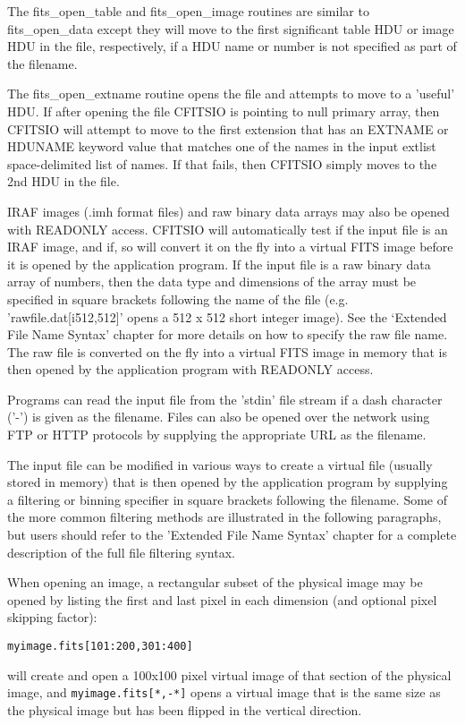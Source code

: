 \documentclass[11pt]{book}
\begin{document}
\begin{description}
The fits\_open\_table and fits\_open\_image routines are similar to
fits\_open\_data except they will move to the first significant table
HDU or image HDU in the file, respectively, if a HDU name or
number is not specified as part of the filename.

The fits\_open\_extname routine opens the file and attempts to move to a 'useful'
HDU. If after opening the file CFITSIO is pointing to null primary array,
then CFITSIO will attempt to move to the first extension that has an EXTNAME or
HDUNAME keyword value that matches one of the names in the input extlist
space-delimited list of names.  If that fails, then CFITSIO simply moves to the
2nd HDU in the file.

IRAF images (.imh format files) and raw binary data arrays may also be
opened with READONLY access.  CFITSIO will automatically test if the
input file is an IRAF image, and if, so will convert it on the fly into
a virtual FITS image before it is opened by the application program.
If the input file is a raw binary data array of numbers, then the data type
and dimensions of the array must be specified in square brackets
following the name of the file (e.g.  'rawfile.dat[i512,512]' opens a
512 x 512 short integer image).  See the `Extended File Name Syntax'
chapter for more details on how to specify the raw file name.  The raw
file is converted on the fly into a virtual FITS image in memory that
is then opened by the application program with READONLY access.

Programs can read the input file from the 'stdin' file stream if a dash
character ('-') is given as the filename. Files can also be opened over
the network using FTP or HTTP protocols by supplying the appropriate URL
as the filename.

The input file can be modified in various ways to create a virtual file
(usually stored in memory) that is then opened by the application
program by supplying a filtering or binning specifier in square brackets
following the filename. Some of the more common filtering methods are
illustrated in the following paragraphs, but users should refer to the
'Extended File Name Syntax' chapter for a complete description of
the full file filtering syntax.

When opening an image, a rectangular subset of the physical image may be
opened by listing the first and last pixel in each dimension (and
optional pixel skipping factor):

\begin{verbatim}
myimage.fits[101:200,301:400]
\end{verbatim}
will create and open a 100x100 pixel virtual image of that section of
the physical image, and \verb+myimage.fits[*,-*]+ opens a virtual image
that is the same size as the physical image but has been flipped in
the vertical direction.


\end{description}
\end{document}
